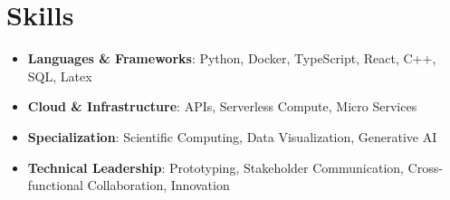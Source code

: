 \documentclass[]{friggeri-cv}
\begin{document}
\vspace*{\fill}
\section{Skills}
\begin{itemize} 
	\item {\large\textbf{\textcolor{pblue}{Languages \& Frameworks}}}: Python, Docker, TypeScript, React, C++, SQL, Latex
	\item {\large\textbf{\textcolor{pblue}{Cloud \& Infrastructure}}}: APIs, Serverless Compute, Micro Services
	\item {\large\textbf{\textcolor{pblue}{Specialization}}}: Scientific Computing, Data Visualization, Generative AI
	\item {\large\textbf{\textcolor{pblue}{Technical Leadership}}}: Prototyping, Stakeholder Communication, Cross-functional Collaboration, Innovation
\end{itemize}

\vspace*{\fill}
\end{document}

